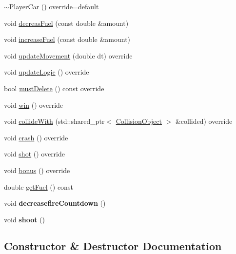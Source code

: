 \begin{DoxyCompactItemize}
\hyperlink{classroadfighter_1_1PlayerCar_a7da4510fe32e4380f7a5771849ac082c}{$\sim$\+Player\+Car} () override=default
\item 
void \hyperlink{classroadfighter_1_1PlayerCar_a3e0ac4c28d1635e5d142c81beeec05dc}{decreas\+Fuel} (const double \&amount)
\item 
void \hyperlink{classroadfighter_1_1PlayerCar_ac313f0e4a46a6aa155936d3d8154ec4a}{increase\+Fuel} (const double \&amount)
\item 
void \hyperlink{classroadfighter_1_1PlayerCar_aa1dcbec01dde1b212e4919b61338edde}{update\+Movement} (double dt) override
\item 
void \hyperlink{classroadfighter_1_1PlayerCar_a01480487ca7978a50a3c6609f1ebe6df}{update\+Logic} () override
\item 
bool \hyperlink{classroadfighter_1_1PlayerCar_aaf4dc181a4d21e544aecd7a8e538cfd6}{must\+Delete} () const override
\item 
void \hyperlink{classroadfighter_1_1PlayerCar_a12f0da24565a4fe64a7bf17fc7c37152}{win} () override
\item 
void \hyperlink{classroadfighter_1_1PlayerCar_ab62e40d949ac12f402fdaaab15c69b81}{collide\+With} (std\+::shared\+\_\+ptr$<$ \hyperlink{classroadfighter_1_1CollisionObject}{Collision\+Object} $>$ \&collided) override
\item 
void \hyperlink{classroadfighter_1_1PlayerCar_a330d071af729d7afbfcfd7ef92516544}{crash} () override
\item 
void \hyperlink{classroadfighter_1_1PlayerCar_a592556a1c6326c9d9a70691f036eaafc}{shot} () override
\item 
void \hyperlink{classroadfighter_1_1PlayerCar_a0f0626a6ea7d25e3ba01a8289d54acac}{bonus} () override
\item 
double \hyperlink{classroadfighter_1_1PlayerCar_aefc7f96fae66baecef10861a6b1fa0f2}{get\+Fuel} () const
\item 
\mbox{\label{classroadfighter_1_1PlayerCar_a65725265e5af175119a4c87be9a74cfe}} 
void {\bfseries decreasefire\+Countdown} ()
\item 
\mbox{\label{classroadfighter_1_1PlayerCar_a2fdc34f0a8256d3fa8e36378c3c64b10}} 
void {\bfseries shoot} ()
\end{DoxyCompactItemize}


\subsection{Constructor \& Destructor Documentation}
\mbox{\label{classroadfighter_1_1PlayerCar_ada20f509f074df30613ecfe09e80c79e}} 
